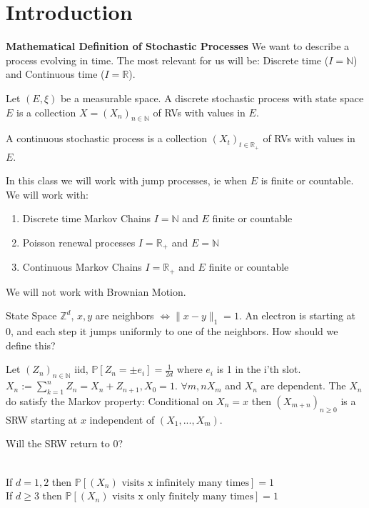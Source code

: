 \chapter{Introduction}
\textbf{Mathematical Definition of Stochastic Processes} We want to describe a process evolving in time. The most relevant for us will be: Discrete time ($I=\mathbb{N}$) and Continuous time ($I=\mathbb{R}$).

\begin{defn}
	Let $(E, \xi)$ be a measurable space. A discrete stochastic process with state space $E$ is a collection $X=(X_n)_{n \in \mathbb{N}}$ of RVs with values in $E$.
\end{defn}

\begin{defn}
A continuous stochastic process is a collection $(X_t)_{t \in \mathbb{R}_+}$ of RVs with values in $E$.
\end{defn}

In this class we will work with jump processes, ie when $E$ is finite or countable.
We will work with:
\begin{enumerate}
	\item Discrete time Markov Chains $I=\mathbb{N}$ and $E$ finite or countable
	\item Poisson renewal processes $I=\mathbb{R}_{+}$ and $E= \mathbb{N} $
	\item Continuous Markov Chains $I= \mathbb{R}_{+}$ and $E$ finite or countable
\end{enumerate}
We will not work with Brownian Motion.

\begin{ex} 
	State Space $\mathbb{Z}^{d}$, $x,y$ are neighbors $\iff \|x-y\|_{1}=1$. An electron is starting at 0, and each step it jumps uniformly to one of the neighbors. How should we define this?

\end{ex}

\begin{defn}[SRW]
	Let $(Z_n)_{n \in \mathbb{N}}$ iid, $\mathbb{P} \left[ Z_n = \pm e_i \right] = \frac{1}{2d}$ where $e_i$ is 1 in the i'th slot. $X_n := \sum_{k=1}^n Z_n= X_n + Z_{n+1}, X_0=1$. $\forall m,n X_m$ and $X_n$ are dependent.  The $X_n$ do satisfy the Markov property: Conditional on $X_n=x$ then $(X_{m+n})_{n \geq 0}$ is a SRW starting at $x$ independent of $(X_1,...,X_m)$.
\end{defn}

Will the SRW return to 0?
\begin{theorem}[Polya]\ \\ \indent
	If $d=1,2$ then $\mathbb{P} \left[ (X_n) \text{ visits x infinitely many times} \right] =1$ \\ \indent
	If $d\geq3$ then $\mathbb{P} \left[ (X_n) \text{ visits x only finitely many times} \right] =1$
\end{theorem}

